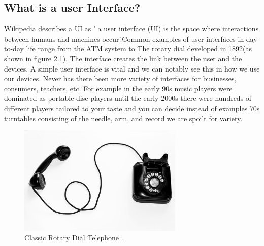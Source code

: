 \subsection{What is a user Interface?}
Wikipedia describes a UI as ' a user interface (UI) is the space where interactions between humans and machines occur'.Common examples of user interfaces in day-to-day life range from the ATM system to The rotary dial developed in 1892(as shown in figure 2.1). The interface creates the link between the user and the devices, A simple user interface is vital and we can notably see this in how we use our devices. Never has there been more variety of interfaces for businesses, consumers, teachers, etc. For example in the early 90s music players were dominated as portable disc players until the early 2000s there were hundreds of different players tailored to your taste and you can decide instead of examples 70s turntables consisting of the needle, arm, and record we are spoilt for variety.
\begin{figure}[h!]
  \centering
    \includegraphics[width=0.7\textwidth]{Research-Latex/images/classicRotary.jpeg}
     \caption{Classic Rotary Dial  Telephone  .}
\end{figure}


